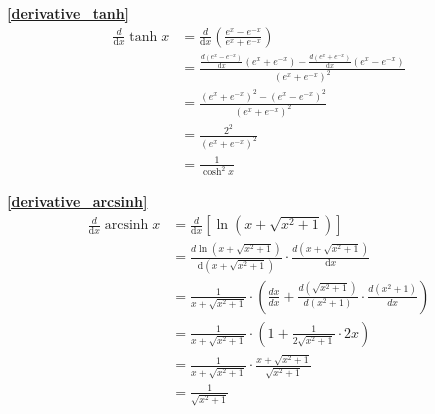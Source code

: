 \textbf{\large \ref{derivative_tanh}}
\begin{displaymath}
    \begin{split}
        \frac{d}{\mathrm{d}{x}}\tanh x&=\frac{d}{\mathrm{d}{x}}\left(\frac{e^x-e^{-x}}{e^x+e^{-x}}\right)\\
                                    &=\frac{\frac{d(e^x-e^{-x})}{\mathrm{d}{x}}(e^x+e^{-x})-\frac{d(e^x+e^{-x})}{\mathrm{d}{x}}(e^x-e^{-x})}{\left(e^x+e^{-x}\right)^2}\\
                                    &=\frac{\left(e^x+e^{-x}\right)^2-\left(e^x-e^{-x}\right)^2}{\left(e^x+e^{-x}\right)^2}\\
                                    &=\frac{2^2}{\left(e^x+e^{-x}\right)^2}\\
                                    &=\frac{1}{\cosh^2 x}
                                \end{split}
\end{displaymath}

\textbf{\large \ref{derivative_arcsinh}}
\begin{displaymath}
    \begin{split}
        \frac{d}{\mathrm{d}{x}}\operatorname{arcsinh}{x} &=\frac{d}{\mathrm{d}{x}}\left[\ln(x+\sqrt{x^2+1})\right]\\
                                    &=\frac{d \ln(x+\sqrt{x^2+1})}{\mathrm{d}{\left(x+\sqrt{x^2+1}\right)}}\cdot\frac{d \left(x+\sqrt{x^2+1}\right)}{\mathrm{d}{x}}\\
                                    &=\frac{1}{x+\sqrt{x^2+1}}\cdot\left(\frac{dx}{dx}+\frac{d \left(\sqrt{x^2+1}\right)}{d\left(x^2+1\right)}\cdot\frac{d(x^2+1)}{dx}\right)\\
                                    &=\frac{1}{x+\sqrt{x^2+1}}\cdot\left(1+\frac{1}{2\sqrt{x^2+1}}\cdot 2x\right)\\                                    
                                    &=\frac{1}{x+\sqrt{x^2+1}}\cdot\frac{x+\sqrt{x^2+1}}{\sqrt{x^2+1}}\\
                                    &=\frac{1}{\sqrt{x^2+1}}
                                \end{split}
\end{displaymath}


